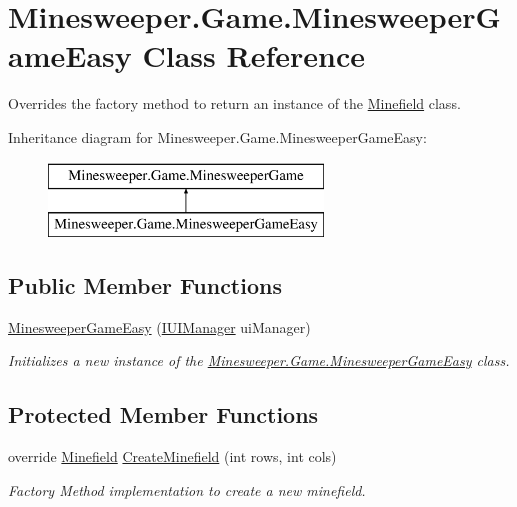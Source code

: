 \hypertarget{class_minesweeper_1_1_game_1_1_minesweeper_game_easy}{\section{Minesweeper.\+Game.\+Minesweeper\+Game\+Easy Class Reference}
\label{class_minesweeper_1_1_game_1_1_minesweeper_game_easy}
}


Overrides the factory method to return an instance of the \hyperlink{class_minesweeper_1_1_game_1_1_minefield}{Minefield} class.  


Inheritance diagram for Minesweeper.\+Game.\+Minesweeper\+Game\+Easy\+:\begin{figure}[H]
\begin{center}
\leavevmode
\includegraphics[height=2.000000cm]{class_minesweeper_1_1_game_1_1_minesweeper_game_easy}
\end{center}
\end{figure}
\subsection*{Public Member Functions}
\begin{DoxyCompactItemize}
\item 
\hyperlink{class_minesweeper_1_1_game_1_1_minesweeper_game_easy_a19034dce499f785fe6abc0684f47cc87}{Minesweeper\+Game\+Easy} (\hyperlink{interface_minesweeper_1_1_game_1_1_i_u_i_manager}{I\+U\+I\+Manager} ui\+Manager)
\begin{DoxyCompactList}\small\item\em Initializes a new instance of the \hyperlink{class_minesweeper_1_1_game_1_1_minesweeper_game_easy}{Minesweeper.\+Game.\+Minesweeper\+Game\+Easy} class. \end{DoxyCompactList}\end{DoxyCompactItemize}
\subsection*{Protected Member Functions}
\begin{DoxyCompactItemize}
\item 
override \hyperlink{class_minesweeper_1_1_game_1_1_minefield}{Minefield} \hyperlink{class_minesweeper_1_1_game_1_1_minesweeper_game_easy_a9f01271eaaabb3d027d00b2677d6995c}{Create\+Minefield} (int rows, int cols)
\begin{DoxyCompactList}\small\item\em Factory Method implementation to create a new minefield. \end{DoxyCompactList}\end{DoxyCompactItemize}


